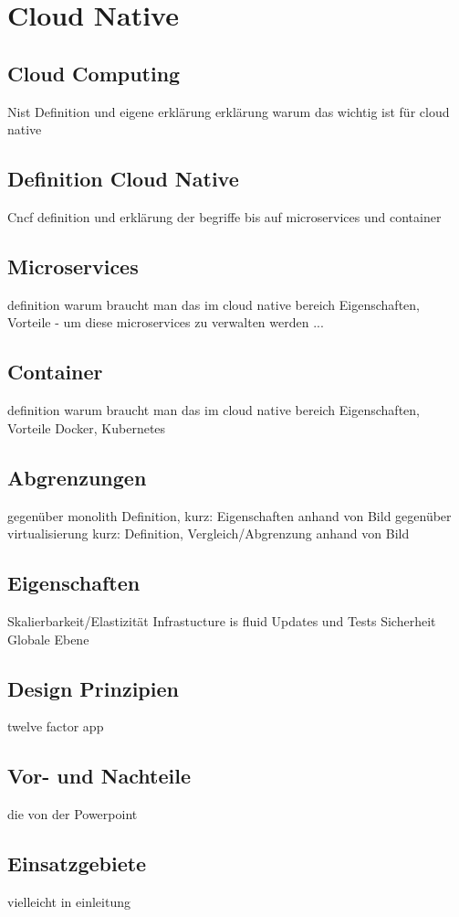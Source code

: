 \chapter{Cloud Native}

\section{Cloud Computing}
Nist Definition und eigene erklärung
erklärung warum das wichtig ist für cloud native
\section{Definition Cloud Native}
Cncf definition und erklärung der begriffe bis auf microservices und container
\section{Microservices}
definition
warum braucht man das im cloud native bereich
Eigenschaften, Vorteile
- um diese microservices zu verwalten werden ...
\section{Container}
definition
warum braucht man das im cloud native bereich
Eigenschaften, Vorteile
 Docker, Kubernetes
\section{Abgrenzungen}
gegenüber monolith
Definition, kurz: Eigenschaften anhand von Bild
gegenüber virtualisierung
kurz: Definition, Vergleich/Abgrenzung anhand von Bild
\section{Eigenschaften}
Skalierbarkeit/Elastizität
Infrastucture is fluid
Updates und Tests
Sicherheit
Globale Ebene
\section{Design Prinzipien}
twelve factor app
\section{Vor- und Nachteile}
die von der Powerpoint
\section{Einsatzgebiete}
vielleicht in einleitung